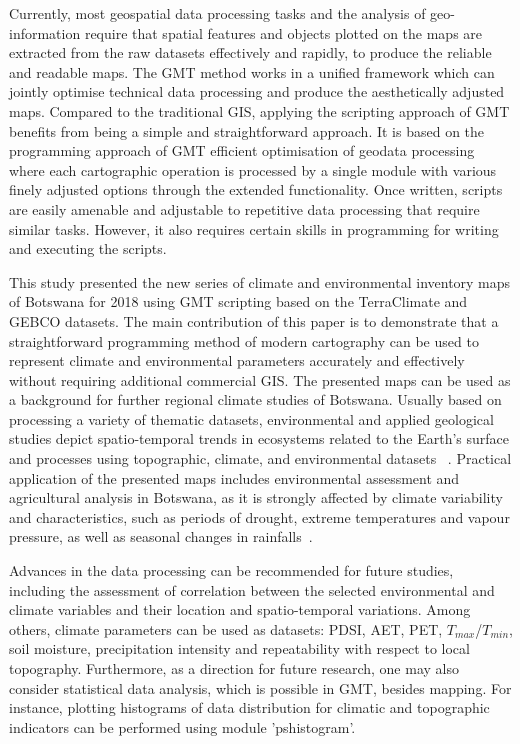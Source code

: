 \documentclass[ijgi,article,accept,pdftex,moreauthors]{Definitions/mdpi}
\begin{document}
Currently, most geospatial data processing tasks and the analysis of geo-information require that spatial features and objects plotted on the maps are extracted from the raw datasets effectively and rapidly, to produce the reliable and readable maps. The GMT method works in a unified framework which can jointly optimise technical data processing and produce the aesthetically adjusted maps. Compared to the traditional GIS, applying the scripting approach of GMT benefits from being a simple and straightforward approach. It is based on the programming approach of GMT efficient optimisation of geodata processing where each cartographic operation is processed by a single module with various finely adjusted options through the extended functionality. Once written, scripts are easily amenable and adjustable to repetitive data processing that require similar tasks. However, it also requires certain skills in programming for writing and executing the scripts.

This study presented the new series of climate and environmental inventory maps of Botswana for 2018 using GMT scripting based on the TerraClimate and GEBCO datasets. The main contribution of this paper is to demonstrate that a straightforward programming method of modern cartography can be used to represent climate and environmental parameters accurately and effectively without requiring additional commercial GIS. The presented maps can be used as a background for further regional climate studies of Botswana. Usually based on processing a variety of thematic datasets, environmental and applied geological studies depict spatio-temporal trends in ecosystems related to the Earth’s surface and processes using topographic, climate, and environmental datasets ~\cite{AkinyemiKgomo,Ishimoto,Klauco2013,Eze,Lemenkova202212,Chipanshi,Klauco2017}. %
Practical application of the presented maps includes environmental assessment and agricultural analysis in Botswana, as it is strongly affected by climate variability and characteristics, such as periods of drought, extreme temperatures and vapour pressure, as well as seasonal changes in rainfalls~\cite{Maruatona,PARIDA2008614,MOSES2018102,DAHLBERG200019}.

Advances in the data processing can be recommended for future studies, including the assessment of correlation between the selected environmental and climate variables and their location and spatio-temporal variations. Among others, climate parameters can be used as datasets: PDSI, AET, PET, $T_{max}$/$T_{min}$, soil moisture, precipitation intensity and repeatability with respect to local topography. Furthermore, as a direction for future research, one may also consider statistical data analysis, which is possible in GMT, besides mapping. For instance, plotting histograms of data distribution for climatic and topographic indicators can be performed using module 'pshistogram'.
\end{document}
